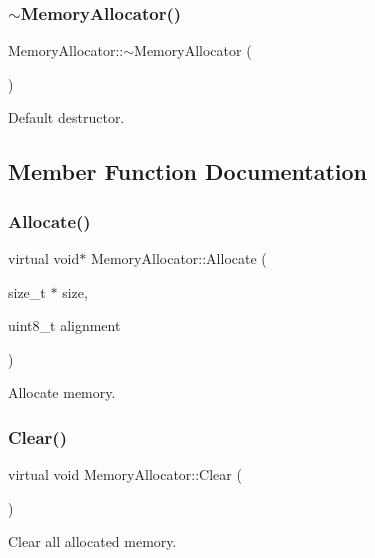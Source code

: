\subsubsection{\texorpdfstring{$\sim$\+Memory\+Allocator()}{~MemoryAllocator()}}
{\footnotesize\ttfamily Memory\+Allocator\+::$\sim$\+Memory\+Allocator (\begin{DoxyParamCaption}{ }\end{DoxyParamCaption})}

Default destructor. 

\subsection{Member Function Documentation}
\mbox{\label{class_memory_allocator_aa56c860aa8027554aa9bd6d7c9780a67}} 
\subsubsection{\texorpdfstring{Allocate()}{Allocate()}}
{\footnotesize\ttfamily virtual void$\ast$ Memory\+Allocator\+::\+Allocate (\begin{DoxyParamCaption}\item[{size\+\_\+t $\ast$}]{size,  }\item[{uint8\+\_\+t}]{alignment }\end{DoxyParamCaption})\hspace{0.3cm}{\ttfamily [pure virtual]}}

Allocate memory. \mbox{\label{class_memory_allocator_a204e81d93d93f1db39e134b956422e56}} 
\subsubsection{\texorpdfstring{Clear()}{Clear()}}
{\footnotesize\ttfamily virtual void Memory\+Allocator\+::\+Clear (\begin{DoxyParamCaption}{ }\end{DoxyParamCaption})\hspace{0.3cm}{\ttfamily [pure virtual]}}

Clear all allocated memory. \mbox{\label{class_memory_allocator_ae6ee38cd52e3e0710251b4e3eb550c6d}} 

